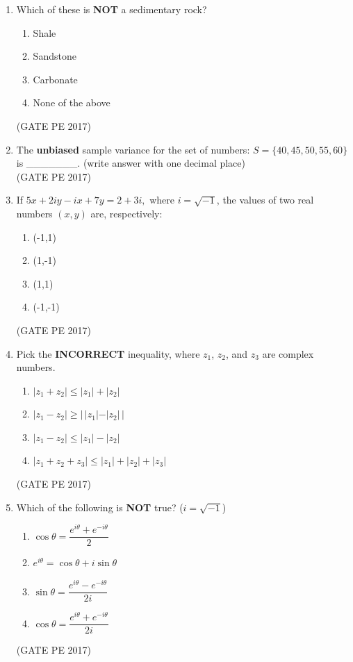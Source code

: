 \documentclass[journal,12pt,onecolumn]{IEEEtran}
\theoremstyle{remark}
\begin{document}
\begin{enumerate}[start=1, label={Q\arabic*.}]
\item Which of these is \textbf{NOT} a sedimentary rock?
\begin{enumerate}
\item Shale
\item Sandstone
\item Carbonate
\item None of the above
\end{enumerate}
\hfill{(GATE PE 2017)}

\item The \textbf{unbiased} sample variance for the set of numbers: $S = \{40, 45, 50, 55, 60\}$ is \_\_\_\_\_\_\_. (write answer with one decimal place)\\

\hfill{(GATE PE 2017)}

\item If $ 5x + 2iy - ix + 7y = 2 + 3i,$ where $i = \sqrt{-1}$, the values of two real numbers $(x, y)$ are, respectively:
\begin{enumerate}
\item (-1,1)
\item (1,-1)
\item (1,1)
\item (-1,-1)
\end{enumerate}
\hfill{(GATE PE 2017)}

\item Pick the \textbf{INCORRECT} inequality, where $z_1$, $z_2$, and $z_3$ are complex numbers.
\begin{enumerate}
\item $|z_1 + z_2| \leq |z_1| + |z_2|$
\item $|z_1 - z_2| \geq |\,|z_1| - |z_2|\,|$
\item $|z_1 - z_2| \leq |z_1| - |z_2|$
\item $|z_1 + z_2 + z_3| \leq |z_1| + |z_2| + |z_3|$
\end{enumerate}
\hfill{(GATE PE 2017)}

\item Which of the following is \textbf{NOT} true? \quad ($i = \sqrt{-1}$)
\begin{enumerate}
\item $\cos \theta = \dfrac{e^{i\theta} + e^{-i\theta}}{2}$
\item $e^{i\theta} = \cos \theta + i \sin \theta$
\item $\sin \theta = \dfrac{e^{i\theta} - e^{-i\theta}}{2i}$
\item $\cos \theta = \dfrac{e^{i\theta} + e^{-i\theta}}{2i}$
\end{enumerate}
\hfill{(GATE PE 2017)}


\end{enumerate}
\end{document}
